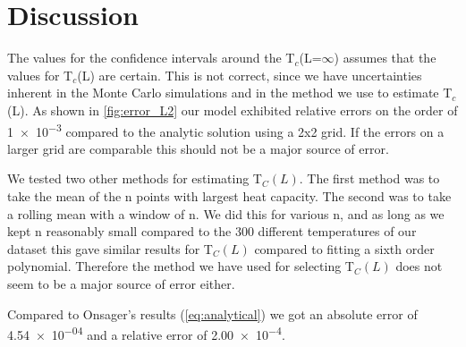\section{Discussion}

The values for the confidence intervals around the T$_c$(L=$\infty$) assumes
that the values for T$_c$(L) are certain. This is not correct, since we have
uncertainties inherent in the Monte Carlo simulations and in the method we use
to estimate T$_c$(L). As shown in \cref{fig:error_L2} our model exhibited
relative errors on the order of \num{1e-3} compared to the analytic solution
using a 2x2 grid. If the errors on a larger grid are comparable this should not
be a major source of error.

We tested two other methods for estimating T$_C(L)$. The first method was to
take the mean of the n points with largest heat capacity. The second was to take
a rolling mean with a window of n. We did this for various n, and as long as we
kept n reasonably small compared to the 300 different temperatures of our
dataset this gave similar results for T$_C(L)$ compared to fitting a sixth order
polynomial. Therefore the method we have used for selecting T$_C(L)$   does not
seem to be a major source of error either.

Compared to Onsager's results (\cref{eq:analytical}) we got an absolute error
of \num{4.54e-04} and a relative error of \num{2.00e-4}.
